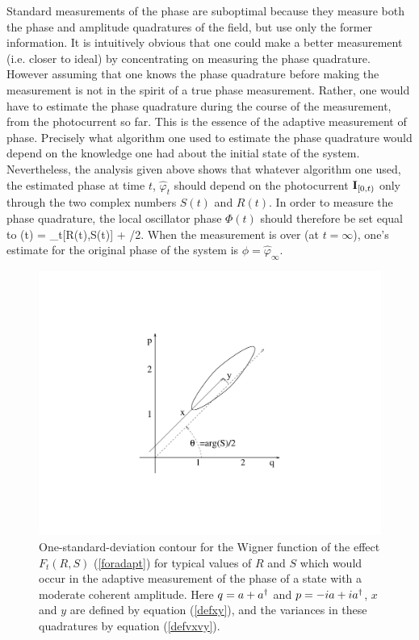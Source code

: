 \documentclass[12pt]{article}
\begin{document}
Standard measurements of the phase are suboptimal because they measure both
the phase and amplitude quadratures of the field, but use only the former
information. It is intuitively obvious that one could make a better measurement 
(i.e. closer to ideal) by concentrating on measuring the phase quadrature.
However assuming that one knows the phase quadrature before making the
measurement is not in the spirit of a true phase measurement. Rather, one would
have to estimate the phase quadrature during the course of the measurement, from
the photocurrent so far. This is the essence of the adaptive measurement of
phase. Precisely what algorithm one used to estimate the phase quadrature would
depend on the knowledge one had about the initial state of the system.
Nevertheless, the analysis given above shows that whatever algorithm one used,
the estimated phase at time $t$, $\hat\varphi_t$ should depend on the
photocurrent ${\bf I}_{[0,t)}$ only through the two complex numbers $S(t)$ and $R(t)$. In
order to measure the phase quadrature, the local oscillator phase $\Phi(t)$ should
therefore be set equal to 
\beq \label{ctrl}
\Phi(t) = \hat\varphi_t[R(t),S(t)] + \pi/2.
\eeq
When the measurement is over (at $t=\infty$), one's estimate for the original phase of the
system is $\phi=\hat\varphi_\infty$. 

\begin{figure}[ht]
\includegraphics[width=6in]{qtaqmt1.pdf}
\caption
{One-standard-deviation contour for the Wigner function of the effect
$F_t(R,S)$  (\ref{foradapt}) 
for typical values of $R$ and $S$ which would occur in
the adaptive measurement of the phase of a state with a moderate coherent
amplitude. Here $q=a+a^\dagger$ and $p = -ia+ia^\dagger$, $x$ and $y$ are defined by
equation (\ref{defxy}), 
and the variances in these quadratures by equation (\ref{defvxvy}).} 
\end{figure}
\end{document}
